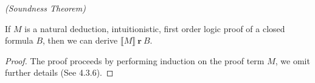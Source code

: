 \begin{mytheorem}
\emph{(Soundness Theorem)}

If $M$ is a natural deduction, intuitionistic, first order logic proof of a closed formula $B$, then we can derive  $ \llbracket M \rrbracket \ \textbf{r} \ B$.

\begin{proof}

The proof proceeds by performing induction on the proof term $M$, we omit further details (See \cite{HS14} 4.3.6).

\begin{comment}
\begin{description}

\item[Case] $\lambda u^A M^B$ We must derive $$\llbracket \lambda u^A M^B
  \rrbracket \textbf{r} B$$
   \begin{description}
     \item[Subcase] $\tau(A) = \epsilon$ In this case the empty term realises
       A, making the $\lambda u $ redundant, which implies that the extracted
       program from M realises B $$\llbracket \lambda u M \rrbracket
       \textbf{r} (A \to B) = \epsilon \textbf{r} A \to \llbracket M
       \rrbracket \textbf{r} B$$
     \item[Subcase] $\tau(A) \neq \epsilon = \tau (B)$ In this case the
       extracted program is empty $ \llbracket \lambda u M \rrbracket = \epsilon$.

       $$\llbracket \lambda u M \rrbracket \textbf{r} (A \to B) = \forall
       x. x \textbf{r} A \to \epsilon \textbf{r} B$$
     \item[Subcase]$\tau (A) \neq \epsilon \neq \tau (B)$ neither the type of $A$ or $B$ is empty. Therefore if we have an $x$ that
       realises $A$ then this $x$ applied to the extracted program realises B.
         

   \end{description}

\item[Case] $\exists^+_{x,A}$ We now consider the case that an existential
  introduction axiom had been applied in the proof. The axiom takes the
  following form $$\exists^+_{x,A}: \forall^{nc} \vec{\rho} \forall x. A \to
  \exists x A $$
  For our proof of the soundness theorem we need to find a derivation
  of $$\llbracket \exists^+_{x,A} \rrbracket \textbf{r} \forall^{nc}
  \vec{\rho} \forall x.A \to \exists x A$$

  \begin{description}
   

\end{comment}
\end{proof}
\end{mytheorem}

